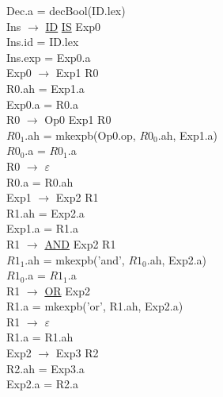 \documentclass[\main/MemoriaPL.tex]{subfiles}
\begin{document}
    \hspace{5mm}Dec.a = decBool(ID.lex)\\
    Ins $\rightarrow$ \underline{ID} \underline{IS} Exp0\\
    \hspace{5mm}Ins.id = ID.lex\\
    \hspace{5mm}Ins.exp = Exp0.a\\
    Exp0 $\rightarrow$ Exp1 R0\\
    \hspace{5mm}R0.ah = Exp1.a\\
    \hspace{5mm}Exp0.a = R0.a\\
    R0 $\rightarrow$ Op0 Exp1 R0\\
    \hspace{5mm}$R0_1$.ah = mkexpb(Op0.op, $R0_0$.ah, Exp1.a)\\
    \hspace{5mm}$R0_0$.a = $R0_1$.a\\
    R0 $\rightarrow$ $\varepsilon$\\
    \hspace{5mm}R0.a = R0.ah\\
    Exp1 $\rightarrow$ Exp2 R1\\
    \hspace{5mm}R1.ah = Exp2.a\\
    \hspace{5mm}Exp1.a = R1.a\\
    R1 $\rightarrow$ \underline{AND} Exp2 R1\\
    \hspace{5mm}$R1_1$.ah = mkexpb('and', $R1_0$.ah, Exp2.a)\\
    \hspace{5mm}$R1_0$.a = $R1_1$.a\\
    R1 $\rightarrow$ \underline{OR} Exp2\\
    \hspace{5mm}R1.a = mkexpb('or', R1.ah, Exp2.a)\\
    R1 $\rightarrow$ $\varepsilon$\\
    \hspace{5mm}R1.a = R1.ah\\
    Exp2 $\rightarrow$ Exp3 R2\\
    \hspace{5mm}R2.ah = Exp3.a\\
    \hspace{5mm}Exp2.a = R2.a\\
\end{document}
